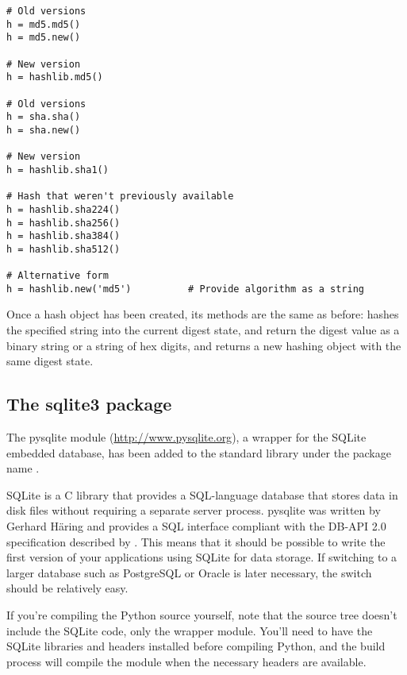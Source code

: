 \documentclass{howto}
\begin{document}
\begin{verbatim}
# Old versions
h = md5.md5()   
h = md5.new()   

# New version 
h = hashlib.md5()

# Old versions
h = sha.sha()   
h = sha.new()   

# New version 
h = hashlib.sha1()

# Hash that weren't previously available
h = hashlib.sha224()
h = hashlib.sha256()
h = hashlib.sha384()
h = hashlib.sha512()

# Alternative form
h = hashlib.new('md5')          # Provide algorithm as a string
\end{verbatim}

Once a hash object has been created, its methods are the same as before:
 hashes the specified string into the 
current digest state,  and 
return the digest value as a binary string or a string of hex digits,
and  returns a new hashing object with the same digest state.

\begin{seealso}


\end{seealso}


\subsection{The sqlite3 package\label{module-sqlite}}

The pysqlite module (\url{http://www.pysqlite.org}), a wrapper for the
SQLite embedded database, has been added to the standard library under
the package name .  

SQLite is a C library that provides a SQL-language database that
stores data in disk files without requiring a separate server process.
pysqlite was written by Gerhard H\"aring and provides a SQL interface
compliant with the DB-API 2.0 specification described by
. This means that it should be possible to write the first
version of your applications using SQLite for data storage.  If
switching to a larger database such as PostgreSQL or Oracle is
later necessary, the switch should be relatively easy.

If you're compiling the Python source yourself, note that the source
tree doesn't include the SQLite code, only the wrapper module.
You'll need to have the SQLite libraries and headers installed before
compiling Python, and the build process will compile the module when
the necessary headers are available.
\end{document}
